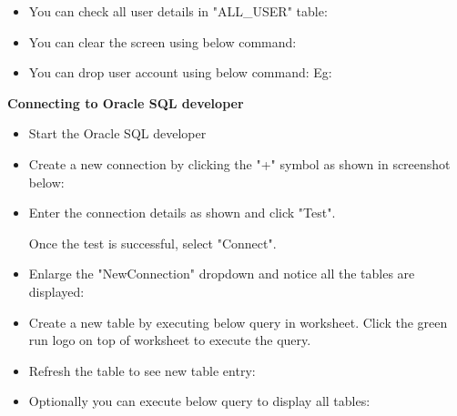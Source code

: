 \begin{flushleft}
\begin{itemize}
		\item You can check all user details in "ALL\_USER" table:
		
		\item You can clear the screen using below command:
	
		\item You can drop user account using below command:
		\bigskip
		Eg:
	\end{itemize}
	
	\newpage
	
	\textbf{Connecting to Oracle SQL developer}
	
	\begin{itemize}
		\item Start the Oracle SQL developer
		\item Create a new connection by clicking the "+" symbol as shown in screenshot below:

		
		\item Enter the connection details as shown and click "Test". 
		
		Once the test is successful, select "Connect".
		
		\item Enlarge the "NewConnection" dropdown and notice all the tables are displayed:
		\newpage
		
		\item Create a new table by executing below query in worksheet. Click the green run logo on top of worksheet to execute the query.

		
		\item Refresh the table to see new table entry:
		
		\item Optionally you can execute below query to display all tables:
		
		
		
	\end{itemize}
	
\end{flushleft}

\newpage
